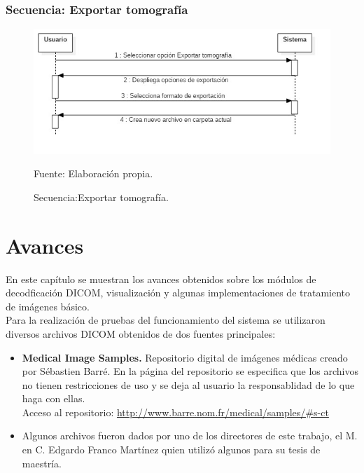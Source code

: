 \documentclass[12pt]{report}
\begin{document}
\subsection{Secuencia: Exportar tomografía}
\begin{figure}[H]
\centering
\includegraphics[width = 12 cm, height = 7 cm]{exportacion}
\caption{Secuencia:Exportar tomografía.}
Fuente: Elaboración propia.
\end{figure}


\chapter{Avances}
En este capítulo se muestran los avances obtenidos sobre los módulos de decodficación DICOM, visualización y algunas implementaciones de tratamiento de imágenes básico.\\

Para la realización de pruebas del funcionamiento del sistema se utilizaron diversos archivos DICOM obtenidos de dos fuentes principales:

\begin{itemize}
\item \textbf{Medical Image Samples. } Repositorio digital de imágenes médicas creado por Sébastien Barré. En la página del repositorio se especifica que los archivos no tienen restricciones de uso y se deja al usuario la responsablidad de lo que haga con ellas.\\

Acceso al repositorio: \url{http://www.barre.nom.fr/medical/samples/#s-ct}

\item Algunos archivos fueron dados por uno de los directores de este trabajo, el M. en C. Edgardo Franco Martínez quien utilizó algunos para su tesis de maestría.

\end{itemize}
\end{document}
